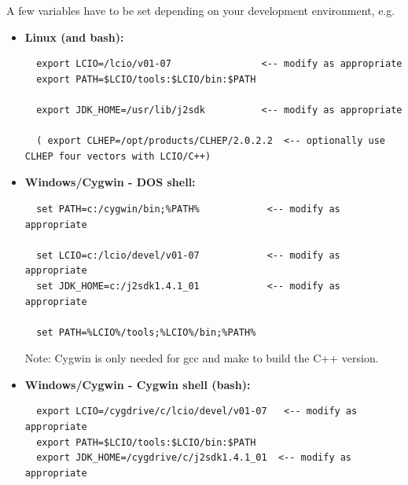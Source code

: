 \documentclass[twoside]{article}
\begin{document}
A few variables have to be set depending on your development environment, e.g.
\begin{itemize}
\item{ {\bf Linux (and bash):} 
\begin{verbatim} 
  export LCIO=/lcio/v01-07                <-- modify as appropriate
  export PATH=$LCIO/tools:$LCIO/bin:$PATH

  export JDK_HOME=/usr/lib/j2sdk          <-- modify as appropriate

  ( export CLHEP=/opt/products/CLHEP/2.0.2.2  <-- optionally use CLHEP four vectors with LCIO/C++) 
\end{verbatim} 
}
\item{ {\bf Windows/Cygwin - DOS shell:} 
\begin{verbatim}
  set PATH=c:/cygwin/bin;%PATH%            <-- modify as appropriate

  set LCIO=c:/lcio/devel/v01-07            <-- modify as appropriate
  set JDK_HOME=c:/j2sdk1.4.1_01            <-- modify as appropriate 

  set PATH=%LCIO%/tools;%LCIO%/bin;%PATH%
\end{verbatim}
Note: Cygwin is only needed for gcc and make to build the C++ version.
}
\item{ {\bf Windows/Cygwin - Cygwin shell (bash):} 
\begin{verbatim}
  export LCIO=/cygdrive/c/lcio/devel/v01-07   <-- modify as appropriate
  export PATH=$LCIO/tools:$LCIO/bin:$PATH
  export JDK_HOME=/cygdrive/c/j2sdk1.4.1_01  <-- modify as appropriate
\end{verbatim} %
}
\end{itemize}



\end{document}
